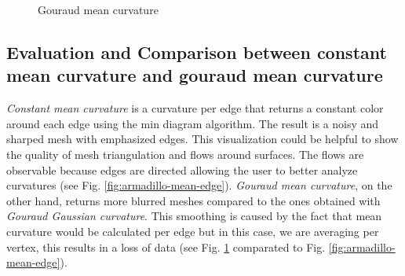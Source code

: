 \begin{figure}[!h]
    \endminipage
    \caption{Gouraud mean curvature} \label{fig:armadillo-mean-vertex}
\end{figure}


\subsection{Evaluation and Comparison between constant mean curvature and gouraud mean curvature}
\textit{Constant mean curvature} is a curvature per
edge that returns a constant color around each edge
using the min diagram algorithm. The result is a noisy and sharped mesh with emphasized edges. This visualization could be helpful to show the quality of mesh triangulation and flows around surfaces. The flows are observable because edges are directed allowing the user to better analyze curvatures (see Fig. \ref{fig:armadillo-mean-edge}). \textit{Gouraud mean curvature}, on the other hand, returns more blurred meshes compared to the ones obtained with  \textit{Gouraud Gaussian curvature}. This smoothing is caused by the fact that mean curvature would be calculated per edge but in this case, we are averaging per vertex, this results in a loss of data (see Fig. \ref{fig:armadillo-mean-vertex} comparated to Fig. \ref{fig:armadillo-mean-edge}).
